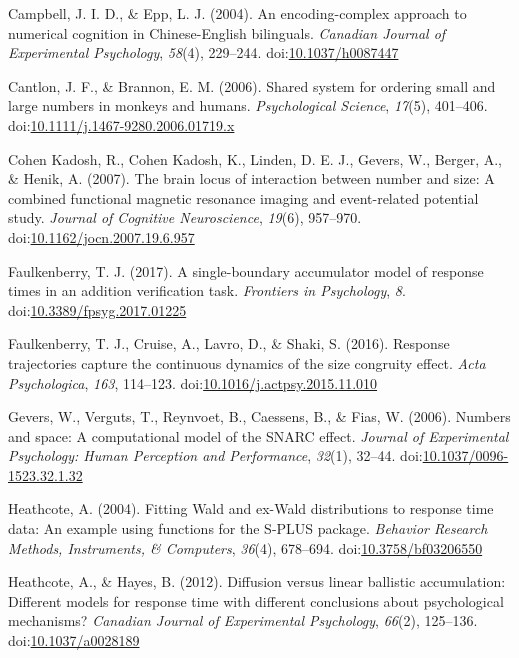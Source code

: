 \documentclass[english,man]{apa6}
\theoremstyle{definition}
\theoremstyle{definition}
\theoremstyle{definition}
\theoremstyle{remark}
\begin{document}
\hypertarget{ref-campbell2004}{}
Campbell, J. I. D., \& Epp, L. J. (2004). An encoding-complex approach
to numerical cognition in Chinese-English bilinguals. \emph{Canadian
Journal of Experimental Psychology}, \emph{58}(4), 229--244.
doi:\href{https://doi.org/10.1037/h0087447}{10.1037/h0087447}

\hypertarget{ref-cantlon2006}{}
Cantlon, J. F., \& Brannon, E. M. (2006). Shared system for ordering
small and large numbers in monkeys and humans. \emph{Psychological
Science}, \emph{17}(5), 401--406.
doi:\href{https://doi.org/10.1111/j.1467-9280.2006.01719.x}{10.1111/j.1467-9280.2006.01719.x}

\hypertarget{ref-cohenKadosh2007}{}
Cohen Kadosh, R., Cohen Kadosh, K., Linden, D. E. J., Gevers, W.,
Berger, A., \& Henik, A. (2007). The brain locus of interaction between
number and size: A combined functional magnetic resonance imaging and
event-related potential study. \emph{Journal of Cognitive Neuroscience},
\emph{19}(6), 957--970.
doi:\href{https://doi.org/10.1162/jocn.2007.19.6.957}{10.1162/jocn.2007.19.6.957}

\hypertarget{ref-faulkenberry2017}{}
Faulkenberry, T. J. (2017). A single-boundary accumulator model of
response times in an addition verification task. \emph{Frontiers in
Psychology}, \emph{8}.
doi:\href{https://doi.org/10.3389/fpsyg.2017.01225}{10.3389/fpsyg.2017.01225}

\hypertarget{ref-faulkenberryShaki2016}{}
Faulkenberry, T. J., Cruise, A., Lavro, D., \& Shaki, S. (2016).
Response trajectories capture the continuous dynamics of the size
congruity effect. \emph{Acta Psychologica}, \emph{163}, 114--123.
doi:\href{https://doi.org/10.1016/j.actpsy.2015.11.010}{10.1016/j.actpsy.2015.11.010}

\hypertarget{ref-gevers2006}{}
Gevers, W., Verguts, T., Reynvoet, B., Caessens, B., \& Fias, W. (2006).
Numbers and space: A computational model of the SNARC effect.
\emph{Journal of Experimental Psychology: Human Perception and
Performance}, \emph{32}(1), 32--44.
doi:\href{https://doi.org/10.1037/0096-1523.32.1.32}{10.1037/0096-1523.32.1.32}

\hypertarget{ref-heathcote2004}{}
Heathcote, A. (2004). Fitting Wald and ex-Wald distributions to response
time data: An example using functions for the S-PLUS package.
\emph{Behavior Research Methods, Instruments, \& Computers},
\emph{36}(4), 678--694.
doi:\href{https://doi.org/10.3758/bf03206550}{10.3758/bf03206550}

\hypertarget{ref-heathcote2012}{}
Heathcote, A., \& Hayes, B. (2012). Diffusion versus linear ballistic
accumulation: Different models for response time with different
conclusions about psychological mechanisms? \emph{Canadian Journal of
Experimental Psychology}, \emph{66}(2), 125--136.
doi:\href{https://doi.org/10.1037/a0028189}{10.1037/a0028189}
\end{document}
